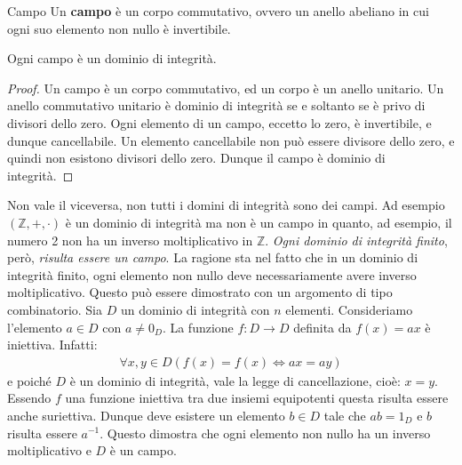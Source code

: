 \begin{defbox}{Campo}
	Un \textbf{campo} è un corpo commutativo, ovvero un anello abeliano in cui ogni suo elemento non nullo è invertibile.
\end{defbox}


\begin{propbox}
	Ogni campo è un dominio di integrità.
\end{propbox}

\begin{proof}
	Un campo è un corpo commutativo, ed un corpo è un anello unitario. Un anello commutativo unitario è dominio di integrità se e soltanto
	se è privo di divisori dello zero. Ogni elemento di un campo, eccetto lo	zero, è invertibile, e dunque cancellabile. Un elemento cancellabile non può essere divisore dello zero, e quindi non esistono divisori dello zero. Dunque il campo è dominio di integrità.
\end{proof}

Non vale il viceversa, non tutti i domini di integrità sono dei campi. Ad esempio $(\mathbb{Z},+,\cdot)$ è un dominio di integrità ma non è un campo in quanto, ad esempio, il numero 2 non ha un inverso moltiplicativo in $\mathbb{Z}$. \textit{Ogni dominio di integrità finito}, però, \textit{risulta essere un campo}. La ragione sta nel fatto che in un dominio di integrità finito, ogni elemento non nullo deve necessariamente avere inverso moltiplicativo. Questo può essere dimostrato con un argomento di tipo combinatorio. Sia $D$ un dominio di integrità con $n$ elementi. Consideriamo l'elemento $a \in D$ con $a \neq 0_{D}$. La funzione $f: D \rightarrow D$ definita da $f(x) = ax$ è iniettiva. Infatti:
	\begin{align*}
		\forall x,y \in D (f(x) = f(x) \iff ax = ay)
	\end{align*}
e poiché $D$ è un dominio di integrità, vale la legge di cancellazione, cioè: $x=y$. Essendo $f$ una funzione iniettiva tra due insiemi equipotenti questa risulta essere anche suriettiva. Dunque deve esistere un elemento $b \in D$ tale che $ab= 1_{D}$ e $b$ risulta essere $a^{-1}$. Questo dimostra che ogni elemento non nullo ha un inverso moltiplicativo e $D$ è un campo.

